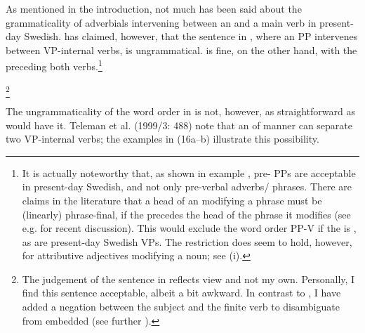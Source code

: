 \documentclass[output=paper, colorlinks, citecolor=brown]{langscibook}
\begin{document}
As mentioned in the introduction, not much has been said about the grammaticality of adverbials intervening between an  and a main verb in present-day Swedish. \citet[157]{Petzell2011} has claimed, however, that the sentence in , where an  PP intervenes between VP-internal verbs, is ungrammatical.  is fine, on the other hand, with the  preceding both verbs.\footnote{It is actually noteworthy that, as shown in example , pre- PPs are acceptable in present-day Swedish, and not only pre-verbal adverbs\slash {} phrases. There are claims in the literature that a head of an  modifying a  phrase must be (linearly) phrase-final, if the  precedes the head of the phrase it modifies (see e.g. \citet{Haider_left-left_nodate} for recent discussion). This would exclude the word order PP-V if the  is , as are present-day Swedish VPs. The restriction does seem to hold, however, for attributive adjectives modifying a noun; see (i). 
\z}

\ea {}\footnote{The judgement of the sentence in  reflects  view and not my own. Personally, I find this sentence acceptable, albeit a bit awkward. In contrast to \citet[157]{Petzell2011}, I have added a negation between the subject and the finite verb to disambiguate from embedded  (see further ).}
\label{ex:sangfelt:15}

\z 
\z 


The ungrammaticality of the word order in  is not, however, as straightforward as \citet{Petzell2011} would have it. Teleman et al. (1999/3: 488) note that an  of manner can separate two VP-internal verbs; the examples in (16a–b) illustrate this possibility.
\end{document}
